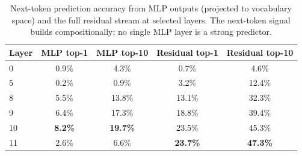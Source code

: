 \begin{table}[t]
    \centering
    \caption{Next-token prediction accuracy from MLP outputs (projected to vocabulary space) and the full residual stream at selected layers. The next-token signal builds compositionally; no single MLP layer is a strong predictor.}
    \label{tab:nexttok}
    \begin{tabular}{@{}lcccc@{}}
        \toprule
        Layer & MLP top-1 & MLP top-10 & Residual top-1 & Residual top-10 \\
        \midrule
        0 & 0.9\% & 4.3\% & 0.7\% & 4.6\% \\
        5 & 0.2\% & 0.9\% & 3.2\% & 12.4\% \\
        8 & 5.5\% & 13.8\% & 13.1\% & 32.3\% \\
        9 & 6.4\% & 17.3\% & 18.8\% & 39.4\% \\
        10 & \textbf{8.2\%} & \textbf{19.7\%} & 23.5\% & 45.3\% \\
        11 & 2.6\% & 6.6\% & \textbf{23.7\%} & \textbf{47.3\%} \\
        \bottomrule
    \end{tabular}
\end{table}
